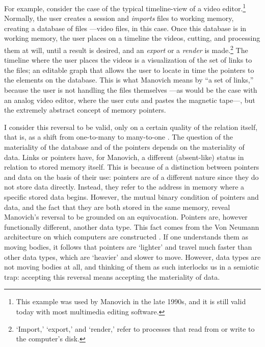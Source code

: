For example, consider the case of the typical timeline-view of a video editor.\footnote{This example was used by Manovich in the late 1990s, and it is still valid today with most multimedia editing software.} Normally, the user creates a session and \textit{imports} files to working memory, creating a database of files ---video files, in this case. Once this database is in working memory, the user places on a timeline the videos, cutting, and processing them at will, until a result is desired, and an \textit{export} or a \textit{render} is made.\footnote{`Import,' `export,' and `render,' refer to processes that read from or write to the computer's disk.} The timeline where the user places the videos is a visualization of the set of links to the files; an editable graph that allows the user to locate in time the pointers to the elements on the database. This is what Manovich means by ``a set of links,'' because the user is not handling the files themselves ---as would be the case with an analog video editor, where the user cuts and pastes the magnetic tape---, but the extremely abstract concept of memory pointers. 

I consider this reversal to be valid, only on a certain quality of the relation itself, that is, as a shift from one-to-many to many-to-one . The question of the materiality of the database and of the pointers depends on the materiality of data. Links or pointers have, for Manovich, a different (absent-like) status in relation to stored memory itself. This is because of a distinction between pointers and data on the basis of their use: pointers are of a different nature since they do not store data directly. Instead, they refer to the address in memory where a specific stored data begins. However, the mutual binary condition of pointers and data, and the fact that they are both stored in the same memory, reveal Manovich's reversal to be grounded on an equivocation. Pointers are, however functionally different, another data type. This fact comes from the Von Neumann architecture on which computers are constructed . If one understands them as moving bodies, it follows that pointers are `lighter' and travel much faster than other data types, which are `heavier' and slower to move. However, data types are not moving bodies at all, and thinking of them as such interlocks us in a semiotic trap: accepting this reversal means accepting the materiality of data.